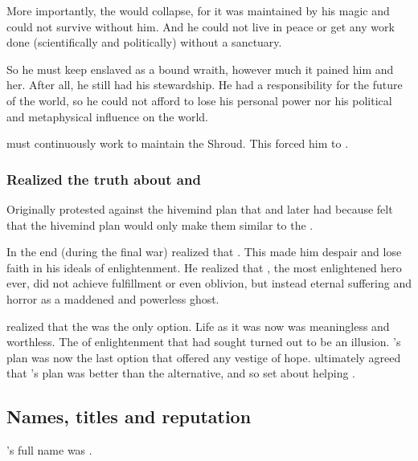 More importantly, the  would collapse, for it was maintained by his magic and could not survive without him.
And he could not live in peace or get any work done (scientifically and politically) without a sanctuary.

So he must keep \Rystessakhin enslaved as a bound wraith, however much it pained him and her.
After all, he still had his stewardship.
He had a responsibility for the future of the world, so he could not afford to lose his personal power nor his political and metaphysical influence on the world.

\Ishnaruchaefir must continuously work to maintain the Shroud. 
This forced him to . 





\subsubsection{Realized the truth about \Sethicus and \Tiamat}
Originally \Iscrafel protested against the hivemind plan that \Tiamat and later \Secherdamon had because \Iscrafel felt that the hivemind plan would only make them similar to the \banes. 

In the end (during the final war) \Iscrafel realized that . 
This made him despair and lose faith in his ideals of enlightenment. 
He realized that \Sethicus, the most enlightened hero ever, did not achieve fulfillment or even oblivion, but instead eternal suffering and horror as a maddened and powerless ghost. 

\Iscrafel realized that the  was the only option.  
Life as it was now was meaningless and worthless. 
The  of enlightenment that \Sethicus had sought turned out to be an illusion. 
\Secherdamon's plan was now the last option that offered any vestige of hope. 
\Iscrafel ultimately agreed that \Secherdamon's plan was better than the alternative, and so set about helping \Secherdamon. 











\subsection{Names, titles and reputation}
\Ishnaruchaefir's full name was \Quessanth \Melechet \Nierzshah \Tzeorossh \Ishnaruchaefir.

